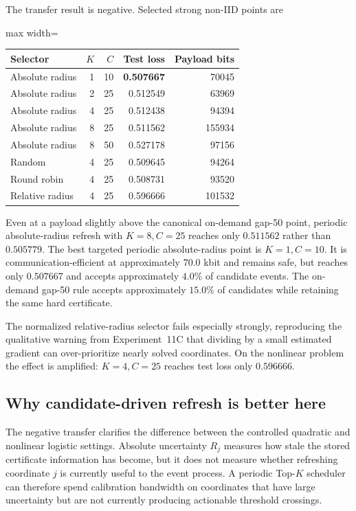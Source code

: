 The transfer result is negative. Selected strong non-IID points are
\begin{center}
\begin{adjustbox}{max width=\textwidth}
\begin{tabular}{lrrrr}
\toprule
Selector & $K$ & $C$ & Test loss & Payload bits\\
\midrule
Absolute radius & 1 & 10 & \textbf{0.507667} & 70045\\
Absolute radius & 2 & 25 & 0.512549 & 63969\\
Absolute radius & 4 & 25 & 0.512438 & 94394\\
Absolute radius & 8 & 25 & 0.511562 & 155934\\
Absolute radius & 8 & 50 & 0.527178 & 97156\\
Random & 4 & 25 & 0.509645 & 94264\\
Round robin & 4 & 25 & 0.508731 & 93520\\
Relative radius & 4 & 25 & 0.596666 & 101532\\
\bottomrule
\end{tabular}
\end{adjustbox}
\end{center}

Even at a payload slightly above the canonical on-demand gap-50 point, periodic absolute-radius refresh with $K=8,C=25$ reaches only $0.511562$ rather than $0.505779$. The best targeted periodic absolute-radius point is $K=1,C=10$. It is communication-efficient at approximately $70.0$ kbit and remains safe, but reaches only $0.507667$ and accepts approximately $4.0\%$ of candidate events. The on-demand gap-50 rule accepts approximately $15.0\%$ of candidates while retaining the same hard certificate.

The normalized relative-radius selector fails especially strongly, reproducing the qualitative warning from Experiment~11C that dividing by a small estimated gradient can over-prioritize nearly solved coordinates. On the nonlinear problem the effect is amplified: $K=4,C=25$ reaches test loss only $0.596666$.

\subsection{Why candidate-driven refresh is better here}

The negative transfer clarifies the difference between the controlled quadratic and nonlinear logistic settings. Absolute uncertainty $R_j$ measures how stale the stored certificate information has become, but it does not measure whether refreshing coordinate $j$ is currently useful to the event process. A periodic Top-$K$ scheduler can therefore spend calibration bandwidth on coordinates that have large uncertainty but are not currently producing actionable threshold crossings.

